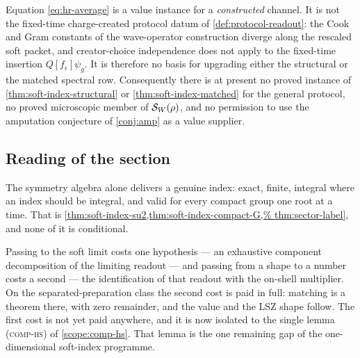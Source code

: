 \begin{scope}
\label{scope:hr-value}
Equation \cref{eq:hr-average} is a value instance for a \emph{constructed}
channel. It is not the fixed-time charge-created protocol datum of
\cref{def:protocol-readout}: the Cook and Gram constants of the wave-operator
construction diverge along the rescaled soft packet, and creator-choice
independence does not apply to the fixed-time insertion
$Q[f_\epsilon]\psi_g$. It is therefore no basis for upgrading either the
structural or the matched spectral row. Consequently there is at present no
proved instance of \cref{thm:soft-index-structural} or
\cref{thm:soft-index-matched} for the general protocol, no proved microscopic
member of $\mathcal{S}_W(\rho)$, and no permission to use the amputation conjecture
of \cref{conj:amp} as a value supplier.
\end{scope}


\subsection{Reading of the section}

The symmetry algebra alone delivers a genuine index: exact, finite, integral
where an index should be integral, and valid for every compact group one root
at a time. That is \cref{thm:soft-index-su2,thm:soft-index-compact-G,%
thm:sector-label}, and none of it is conditional.

Passing to the soft limit costs one hypothesis --- an exhaustive component
decomposition of the limiting readout --- and passing from a shape to a number
costs a second --- the identification of that readout with the on-shell
multiplier. On the separated-preparation class the second cost is paid in
full: matching is a theorem there, with zero remainder, and the value and the
LSZ shape follow. The first cost is not yet paid anywhere, and it is now
isolated to the single lemma \textsc{(comp-hs)} of \cref{scope:comp-hs}. That
lemma is the one remaining gap of the one-dimensional soft-index programme.
